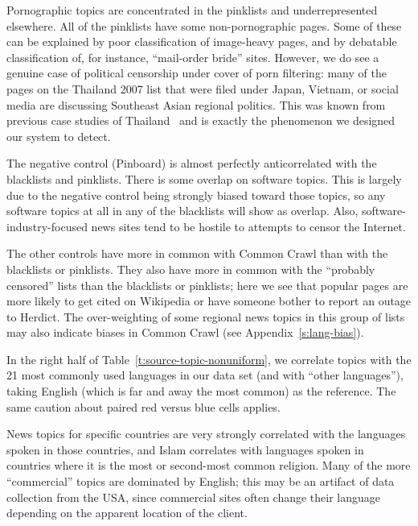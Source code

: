 Pornographic topics are concentrated in the pinklists and
underrepresented elsewhere.  All of the pinklists have some
non-pornographic pages.  Some of these can be explained by poor
classification of image-heavy pages, and by debatable classification
of, for instance, “mail-order bride” sites.  However, we do see a
genuine case of political censorship under cover of porn filtering:
many of the pages on the Thailand 2007 list that were filed under
Japan, Vietnam, or social media are discussing Southeast Asian
regional politics.  This was known from previous case studies of
Thailand~\cite{oni.thailand} and is exactly the phenomenon we designed
our system to detect.

The negative control (Pinboard) is almost perfectly anticorrelated
with the blacklists and pinklists.  There is some overlap on software
topics.  This is largely due to the negative control being strongly
biased toward those topics, so any software topics at all in any of
the blacklists will show as overlap.  Also, software-industry-focused
news sites tend to be hostile to attempts to censor the Internet.

The other controls have more in common with Common Crawl than with the
blacklists or pinklists.  They also have more in common with the
“probably censored” lists than the blacklists or pinklists; here we
see that popular pages are more likely to get cited on Wikipedia or
have someone bother to report an outage to Herdict.  The
over-weighting of some regional news topics in this group of lists may
also indicate biases in Common Crawl (see Appendix~\ref{s:lang-bias}).

In the right half of Table~\ref{t:source-topic-nonuniform}, we
correlate topics with the 21 most commonly used languages in our data
set (and with “other languages”), taking English (which is far and
away the most common) as the reference.  The same caution about paired
red versus blue cells applies.

News topics for specific countries are very strongly correlated with
the languages spoken in those countries, and Islam correlates with
languages spoken in countries where it is the most or second-most
common religion.  Many of the more “commercial” topics are dominated
by English; this may be an artifact of data collection from the USA,
since commercial sites often change their language depending on the
apparent location of the client.

